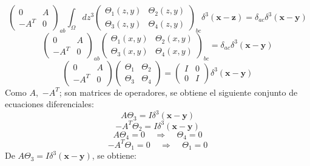 \documentclass[a4paper,12pt]{article}
\begin{document}
\begin{equation}
\left(\begin{matrix}
0 & A\\
-A^T & 0 
\end{matrix}\right)_{ab}\int_\Omega dz^3\left(\begin{matrix}
 \Theta_1(z,y)&\Theta_2(z,y) \\
 \Theta_3(z,y)&\Theta_4(z,y)  
\end{matrix}\right)_{bc} \delta^3(\textbf{x}-\textbf{z})=\delta_{ac}\delta^3(\textbf{x}-\textbf{y})  
\end{equation}
\begin{equation}
\left(\begin{matrix}
0 & A\\
-A^T& 0 
\end{matrix}\right)_{ab}\left(\begin{matrix}
 \Theta_1(x,y)&\Theta_2(x,y) \\
 \Theta_3(x,y)&\Theta_4(x,y)  
\end{matrix}\right)_{bc} =\delta_{ac}\delta^3(\textbf{x}-\textbf{y})  
\end{equation}
\begin{equation}
\left(\begin{matrix}
0 & A\\
-A^T & 0 
\end{matrix}\right)\left(\begin{matrix}
 \Theta_1&\Theta_2 \\
 \Theta_3&\Theta_4  
\end{matrix}\right) =\left(\begin{matrix}
 I&0\\
 0&I 
\end{matrix}\right) \delta^3(\textbf{x}-\textbf{y})  
\end{equation}
Como \mbox{$A$, $-A^T$}; son matrices de operadores, se obtiene el siguiente conjunto de ecuaciones diferenciales:
\begin{equation}
A\Theta_3=I\delta^3(\textbf{x}-\textbf{y})  
\end{equation}
$$-A^T\Theta_2=I\delta^3(\textbf{x}-\textbf{y})  $$
$$A\Theta_4=0 \ \ \ \ \ \Longrightarrow \ \ \ \ \ \Theta_4=0 $$
$$-A^T\Theta_1=0 \ \ \ \  \ \Longrightarrow\ \ \ \ \ \Theta_1=0$$
De $A\Theta_3=I\delta^3(\textbf{x}-\textbf{y})$, se obtiene:
\end{document}
